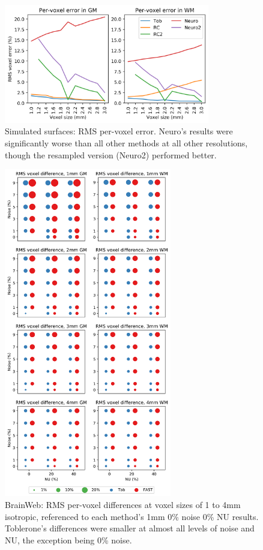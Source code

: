 \documentclass[12pt]{report}
\begin{document}
\begin{appendices}
\begin{figure}
\centering
\includegraphics[width = 0.8\textwidth]{tob_sim_voxel_supp.png}
\caption{Simulated surfaces: RMS per-voxel error. Neuro’s results were significantly worse than all other methods at all other resolutions, though the resampled version (Neuro2) performed better. }
\label{tob_sim_voxel_supp}
\end{figure}

\begin{figure}
\centering
\includegraphics[width = 0.65\textwidth]{brainweb_voxel_supp.png}
\caption{BrainWeb: RMS per-voxel differences at voxel sizes of 1 to 4mm isotropic, referenced to each method’s 1mm 0\% noise 0\% NU results. Toblerone’s differences were smaller at almost all levels of noise and NU, the exception being 0\% noise.  }
\label{brainweb_voxel_supp}
\end{figure}


\end{appendices}
\end{document}
